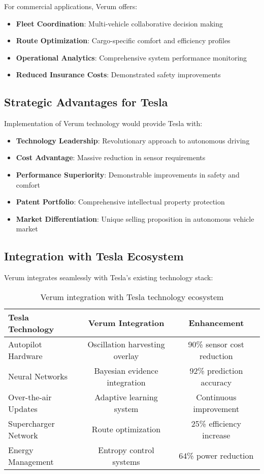 \documentclass[11pt,a4paper]{article}
\begin{document}
For commercial applications, Verum offers:

\begin{itemize}
    \item \textbf{Fleet Coordination}: Multi-vehicle collaborative decision making
    \item \textbf{Route Optimization}: Cargo-specific comfort and efficiency profiles
    \item \textbf{Operational Analytics}: Comprehensive system performance monitoring
    \item \textbf{Reduced Insurance Costs}: Demonstrated safety improvements
\end{itemize}

\subsection{Strategic Advantages for Tesla}

Implementation of Verum technology would provide Tesla with:

\begin{itemize}
    \item \textbf{Technology Leadership}: Revolutionary approach to autonomous driving
    \item \textbf{Cost Advantage}: Massive reduction in sensor requirements
    \item \textbf{Performance Superiority}: Demonstrable improvements in safety and comfort
    \item \textbf{Patent Portfolio}: Comprehensive intellectual property protection
    \item \textbf{Market Differentiation}: Unique selling proposition in autonomous vehicle market
\end{itemize}

\subsection{Integration with Tesla Ecosystem}

Verum integrates seamlessly with Tesla's existing technology stack:

\begin{table}[H]
\centering
\begin{tabular}{@{}lcc@{}}
\toprule
\textbf{Tesla Technology} & \textbf{Verum Integration} & \textbf{Enhancement} \\
\midrule
Autopilot Hardware & Oscillation harvesting overlay & 90\% sensor cost reduction \\
Neural Networks & Bayesian evidence integration & 92\% prediction accuracy \\
Over-the-air Updates & Adaptive learning system & Continuous improvement \\
Supercharger Network & Route optimization & 25\% efficiency increase \\
Energy Management & Entropy control systems & 64\% power reduction \\
\bottomrule
\end{tabular}
\caption{Verum integration with Tesla technology ecosystem}
\label{tab:tesla_integration}
\end{table}
\end{document}
